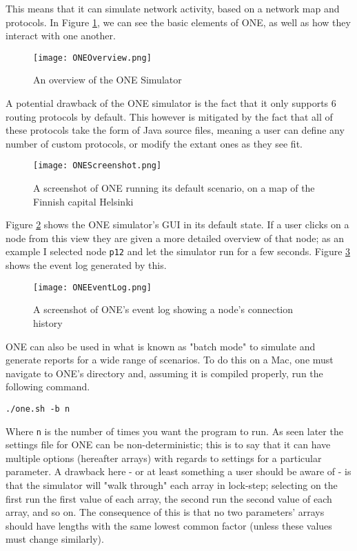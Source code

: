 \documentclass[12pt]{report}
\begin{document}
This means that it can simulate network activity, based on a network map and protocols.
In Figure \ref{fig:oneoverview}, we can see the basic elements of ONE, as well as how they interact with one another\cite{simutools}.

\begin{figure}[ht]
  \caption{An overview of the ONE Simulator}
  \centering
  \texttt{[image: ONEOverview.png]}
  \label{fig:oneoverview}
\end{figure}

A potential drawback of the ONE simulator is the fact that it only supports 6 routing protocols by default\cite{simutools}.
This however is mitigated by the fact that all of these protocols take the form of Java source files, meaning a user can define any number of custom protocols, or modify the extant ones as they see fit.

\begin{figure}[ht]
  \caption{A screenshot of ONE running its default scenario, on a map of the Finnish capital Helsinki}
  \centering
  \texttt{[image: ONEScreenshot.png]}
  \label{fig:onescreenshot}
\end{figure}

Figure \ref{fig:onescreenshot} shows the ONE simulator's GUI in its default state.
If a user clicks on a node from this view they are given a more detailed overview of that node; as an example I selected node \verb|p12| and let the simulator run for a few seconds.
Figure \ref{fig:oneeventlog} shows the event log generated by this.

\begin{figure}[ht]
  \caption{A screenshot of ONE's event log showing a node's connection history}
  \centering
  \texttt{[image: ONEEventLog.png]}
  \label{fig:oneeventlog}
\end{figure}

ONE can also be used in what is known as "batch mode" to simulate and generate reports for a wide range of scenarios.
To do this on a Mac, one must navigate to ONE's directory and, assuming it is compiled properly, run the following command.

\begin{lstlisting}
./one.sh -b n
\end{lstlisting}

Where \verb|n| is the number of times you want the program to run.
As seen later the settings file for ONE can be non-deterministic; this is to say that it can have multiple options (hereafter arrays) with regards to settings for a particular parameter.
A drawback here - or at least something a user should be aware of - is that the simulator will "walk through" each array in lock-step; selecting on the first run the first value of each array, the second run the second value of each array, and so on.
The consequence of this is that no two parameters' arrays should have lengths with the same lowest common factor (unless these values must change similarly).
\end{document}
